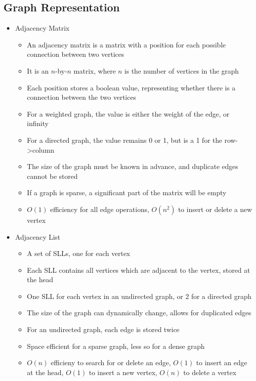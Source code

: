 \subsection*{Graph Representation}

\begin{itemize}
  \item Adjacency Matrix
  \begin{itemize}
    \item An adjacency matrix is a matrix with a position for each possible connection between two vertices
    \item It is an $n$-by-$n$ matrix, where $n$ is the number of vertices in the graph
    \item Each position stores a boolean value, representing whether there is a connection between the two vertices
    \item For a weighted graph, the value is either the weight of the edge, or infinity
    \item For a directed graph, the value remains 0 or 1, but is a 1 for the row->column
    \item The size of the graph must be known in advance, and duplicate edges cannot be stored
    \item If a graph is sparse, a significant part of the matrix will be empty
    \item $O(1)$ efficiency for all edge operations, $O(n^2)$ to insert or delete a new vertex
  \end{itemize}
  \item Adjacency List
  \begin{itemize}
    \item A set of SLLs, one for each vertex
    \item Each SLL contains all vertices which are adjacent to the vertex, stored at the head
    \item One SLL for each vertex in an undirected graph, or 2 for a directed graph
    \item The size of the graph can dynamically change, allows for duplicated edges
    \item For an undirected graph, each edge is stored twice
    \item Space efficient for a sparse graph, less so for a dense graph
    \item $O(n)$ efficieny to search for or delete an edge, $O(1)$ to insert an edge at the head, $O(1)$ to insert a new vertex, $O(n)$ to delete a vertex
  \end{itemize}
\end{itemize}

